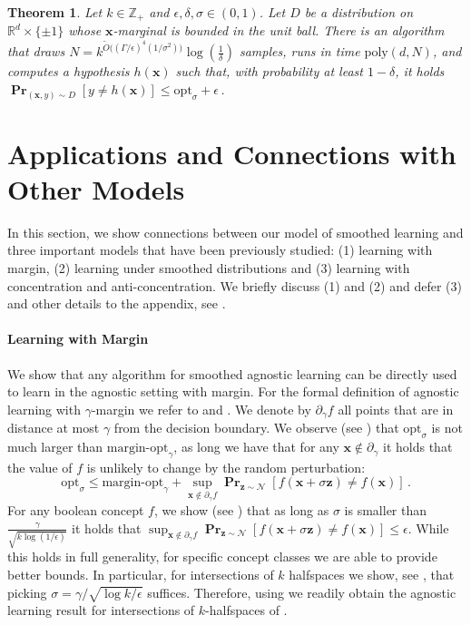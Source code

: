 \documentclass[10pt,a4paper]{article}
\newtheorem{theorem}{Theorem}[section]
\renewcommand\vec[1]{\mathbf{#1}}
\DeclareMathOperator*{\pr}{\mathbf{Pr}}
\newcommand{\normal}{\mathcal{N}}
\newcommand{\R}{\mathbb{R}}
\newcommand{\eps}{\epsilon}
\newcommand{\poly}{\mathrm{poly}}
\newcommand{\opt}{\mathrm{opt}}
\newcommand{\1}{\Ind}
\newcommand{\x}{\vec x}
\newcommand{\Djoint}{D}
\begin{document}
\begin{theorem}
\label{thm:random_proj_bounded_main}
    Let $k \in \mathbb Z_+$ and $\epsilon, \delta,\sigma \in (0,1)$. Let $D$ be a distribution on $\R^d\times \{\pm 1\}$ whose $\x$-marginal is bounded in the unit ball.  There is an algorithm that draws $N = k^{\tilde{O}\big((\Gamma/\epsilon)^4(1/\sigma^2)\big)}\log (\frac{1}{\delta})$ samples, runs in time $\poly(d,N)$, and computes a hypothesis $h(\x)$ such that, with probability at least $1-\delta$, it holds
    $ \pr_{(\x, y) \sim \Djoint}[y\neq h(\x)] \le \opt_\sigma + \eps\,$.
\end{theorem}





\section{Applications and Connections with Other Models}
In this section, we show connections between our model of smoothed learning and three important models that have been previously studied: (1) learning with margin, (2) learning under smoothed distributions and (3) learning with concentration and anti-concentration.  We briefly discuss (1) and (2) and defer (3) and other details to the appendix, see . 
\paragraph{Learning with Margin}
We show that any algorithm
for smoothed agnostic learning can be directly used to learn in the agnostic setting with margin.
For the formal definition of agnostic learning with $\gamma$-margin we refer to 
and .
We denote by $\partial_\gamma f$ all points that are in distance at most $\gamma$ from the decision boundary.
We observe (see ) that $\opt_\sigma$ is not much larger than $\text{margin-opt}_\gamma$, as long we have that for any $\x\notin\partial_\gamma$ it holds that the value of $f$ is unlikely to change by the random perturbation:
\[
\opt_\sigma \leq \text{margin-opt}_\gamma + \sup_{\x \notin \partial_\gamma f} \pr_{\vec z \sim \normal}[f(\x + \sigma \vec z) \neq f(\x)] \,.
\]
For any boolean concept $f$, we show  (see ) that 
as long as $\sigma$ is smaller than $\frac{\gamma}{\sqrt{k \log({1}/{\eps})}}$ it holds that 
$\sup_{\x \notin \partial_\gamma f} \pr_{\vec z \sim \normal}[f(\x + \sigma \vec z) \neq f(\x)] \leq \eps$.
While this holds in full generality, for specific concept classes we are able to provide better bounds.
In particular, for intersections of $k$ halfspaces we show, see ,
that picking $\sigma = \gamma/\sqrt{\log k/\eps}$ suffices.  Therefore, using 
we readily obtain the agnostic learning result for intersections of $k$-halfspaces of .
\end{document}
